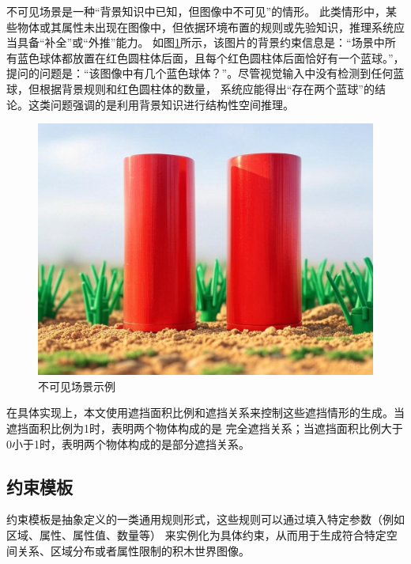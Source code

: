 不可见场景是一种“背景知识中已知，但图像中不可见”的情形。
此类情形中，某些物体或其属性未出现在图像中，但依据环境布置的规则或先验知识，推理系统应当具备“补全”或“外推”能力。
如图\ref{fig:not-observable-scene-example}所示，该图片的背景约束信息是：“场景中所有蓝色球体都放置在红色圆柱体后面，且每个红色圆柱体后面恰好有一个蓝球。”，
提问的问题是：“该图像中有几个蓝色球体？”。尽管视觉输入中没有检测到任何蓝球，但根据背景规则和红色圆柱体的数量，
系统应能得出“存在两个蓝球”的结论。这类问题强调的是利用背景知识进行结构性空间推理。
\begin{figure}[h]
\centering
\includegraphics[scale=0.16]{figures/不可见场景示例.jpg}
\caption{不可见场景示例}
\label{fig:not-observable-scene-example}
\end{figure}

在具体实现上，本文使用遮挡面积比例和遮挡关系来控制这些遮挡情形的生成。当遮挡面积比例为1时，表明两个物体构成的是
完全遮挡关系；当遮挡面积比例大于0小于1时，表明两个物体构成的是部分遮挡关系。
\subsection{约束模板}
\label{constraint-template}
约束模板是抽象定义的一类通用规则形式，这些规则可以通过填入特定参数（例如区域、属性、属性值、数量等）
来实例化为具体约束，从而用于生成符合特定空间关系、区域分布或者属性限制的积木世界图像。

